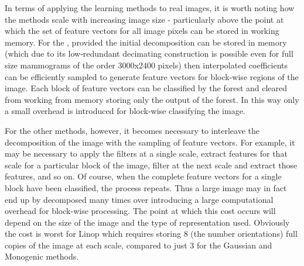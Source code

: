\label{s:filtering_computation}
%
In terms of applying the learning methods to real images, it is worth noting how the methods scale with increasing image size - particularly above the point at which the set of feature vectors for all image pixels can be stored in working memory. For the \dtcwt{}, provided the initial decomposition can be stored in memory (which due to its low-redundant decimating construction is possible even for full size mammograms of the order 3000x2400 pixels) then interpolated coefficients can be efficiently sampled to generate feature vectors for block-wise regions of the image. Each block of feature vectors can be classified by the forest and cleared from working from memory storing only the output of the forest. In this way only a small overhead is introduced for block-wise classifying the image. 

For the other methods, however, it becomes necessary to interleave the decomposition of the image with the sampling of feature vectors. For example, it may be necessary to apply the filters at a single scale, extract features for that scale for a particular block of the image, filter at the next scale and extract those features, and so on. Of course, when the complete feature vectors for a single block have been classified, the process repeats. Thus a large image may in fact end up by decomposed many times over introducing a large computational overhead for block-wise processing. The point at which this cost occurs will depend on the size of the image and the type of representation used. Obviously the cost is worst for Linop which requires storing 8 (\ie the number orientations) full copies of the image at each scale, compared to just 3 for the Gaussian and Monogenic methods.
